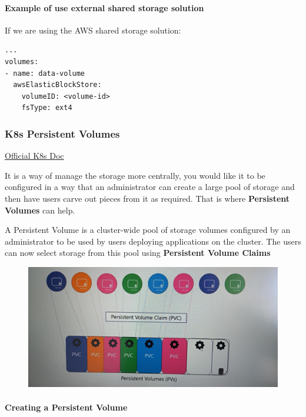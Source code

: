 \documentclass{article}
\newenvironment{codetemplate}[1][]{%
  \mybasecolorbox[#1]
  \itshape
}{%
  \endmybasecolorbox
}
\begin{document}
\paragraph{Example of use external shared storage solution}

If we are using the AWS shared storage solution:
\begin{codetemplate}{}
\begin{verbatim}
...
volumes:
- name: data-volume
  awsElasticBlockStore:
    volumeID: <volume-id>
    fsType: ext4
\end{verbatim}
\end{codetemplate}

\subsubsection{K8s Persistent Volumes}

\href{https://kubernetes.io/docs/concepts/storage/persistent-volumes/}{Official K8s Doc}

It is a way of manage the storage more centrally, you would like it to be configured in a way that an administrator can create a large pool of storage and then have users carve out pieces from it as required. That is where \textbf{Persistent Volumes} can help.

A Persistent Volume is a cluster-wide pool of storage volumes configured by an administrator to be used by users deploying applications on the cluster. The users can now select storage from this pool using \textbf{Persistent Volume Claims}

\begin{figure}[H]
    \includegraphics[width=\textwidth]{pictures/pv.png}
\end{figure}

\paragraph{Creating a Persistent Volume}
\end{document}
